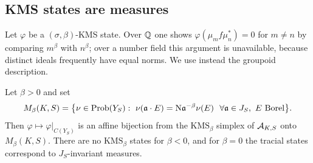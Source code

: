 \subsection{KMS states are measures}

Let $\varphi$ be a $(\sigma,\beta)$-KMS state. Over $\mathbb{Q}$ one shows
$\varphi(\mu_mf\mu_n^*)=0$ for $m\neq n$ by comparing $m^\beta$ with $n^\beta$;
over a number field this argument is unavailable, because distinct ideals
frequently have equal norms. We use instead the groupoid description.

\begin{proposition}\label{Main:prop:kmsmeasures}
Let $\beta>0$ and set
\[
M_\beta(K,S)=\bigl\{\nu\in\Prob(Y_S):\ \nu(\aaa\cdot E)=\Ns\aaa^{-\beta}\nu(E)\ \ \forall\aaa\in J_S,\ E\ \text{Borel}\bigr\}.
\]
Then $\varphi\mapsto\varphi|_{C(Y_S)}$ is an affine bijection from the
$\mathrm{KMS}_\beta$ simplex of $\mathcal{A}_{K,S}$ onto $M_\beta(K,S)$. There are no
$\mathrm{KMS}_\beta$ states for $\beta<0$, and for $\beta=0$ the tracial states
correspond to $J_S$-invariant measures.
\end{proposition}


